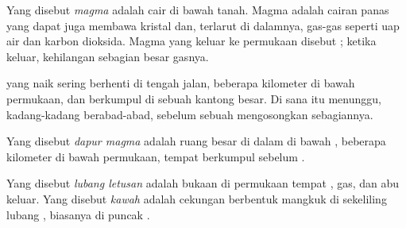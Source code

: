 \begin{definition}[Magma]\label{def:g7:volcanoes:magma}
Yang disebut \emph{magma} adalah  cair di bawah tanah.
Magma adalah cairan panas yang dapat juga membawa kristal dan, terlarut di
dalamnya, gas-gas seperti uap air dan karbon dioksida. Magma yang keluar
ke permukaan disebut ; ketika keluar,  kehilangan sebagian besar
gasnya.
\end{definition}

 yang naik sering berhenti di tengah jalan, beberapa kilometer di
bawah permukaan, dan berkumpul di sebuah kantong besar. Di sana  itu
menunggu, kadang-kadang berabad-abad, sebelum sebuah  mengosongkan
sebagiannya.

\begin{definition}\label{def:g7:volcanoes:magma-chamber}
Yang disebut \emph{dapur magma} adalah ruang besar di
dalam  di bawah , beberapa kilometer di bawah permukaan,
tempat  berkumpul sebelum .
\end{definition}

\begin{definition}\label{def:g7:volcanoes:vent}
Yang disebut \emph{lubang letusan} adalah bukaan di
permukaan tempat , gas, dan abu keluar. Yang disebut
\emph{kawah} adalah cekungan berbentuk mangkuk di sekeliling
lubang , biasanya di puncak .
\end{definition}

